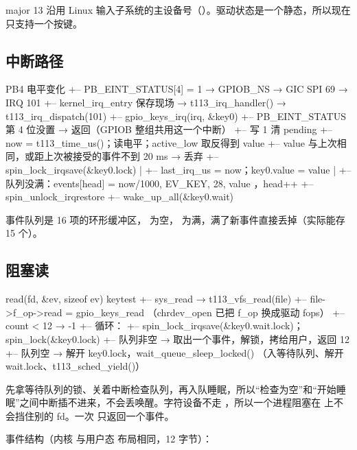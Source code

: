 major 13 沿用 Linux 输入子系统的主设备号（）。驱动状态是一个静态，所以现在只支持一个按键。

\subsection{中断路径}

\begin{txtcode}
PB4 电平变化
+-- PB_EINT_STATUS[4] = 1 → GPIOB_NS → GIC SPI 69 → IRQ 101
    +-- kernel_irq_entry 保存现场 → t113_irq_handler() → t113_irq_dispatch(101)
    +-- gpio_keys_irq(irq, &key0)
        +-- PB_EINT_STATUS 第 4 位没置 → 返回（GPIOB 整组共用这一个中断）
        +-- 写 1 清 pending
        +-- now = t113_time_us()；读电平；active_low 取反得到 value
        +-- value 与上次相同，或距上次被接受的事件不到 20 ms → 丢弃
        +-- spin_lock_irqsave(&key0.lock)
        |   +-- last_irq_us = now；key0.value = value
        |   +-- 队列没满：events[head] = { now/1000, EV_KEY, 28, value }，head++
        +-- spin_unlock_irqrestore
        +-- wake_up_all(&key0.wait)
\end{txtcode}

事件队列是 16 项的环形缓冲区， 为空， 为满，满了新事件直接丢掉（实际能存 15 个）。

\subsection{阻塞读}

\begin{txtcode}
read(fd, &ev, sizeof ev)                    keytest
+-- sys_read → t113_vfs_read(file)
    +-- file->f_op->read = gpio_keys_read  （chrdev_open 已把 f_op 换成驱动 fops）
        +-- count < 12 → -1
        +-- 循环：
            +-- spin_lock_irqsave(&key0.wait.lock)；spin_lock(&key0.lock)
            +-- 队列非空 → 取出一个事件，解锁，拷给用户，返回 12
            +-- 队列空   → 解开 key0.lock，wait_queue_sleep_locked()
                           （入等待队列、解开 wait.lock、t113_sched_yield()）
\end{txtcode}

先拿等待队列的锁、关着中断检查队列，再入队睡眠，所以“检查为空”和“开始睡眠”之间中断插不进来，不会丢唤醒。字符设备不走 ，所以一个进程阻塞在 上不会挡住别的 fd。一次  只返回一个事件。

事件结构（内核  与用户态  布局相同，12 字节）：

